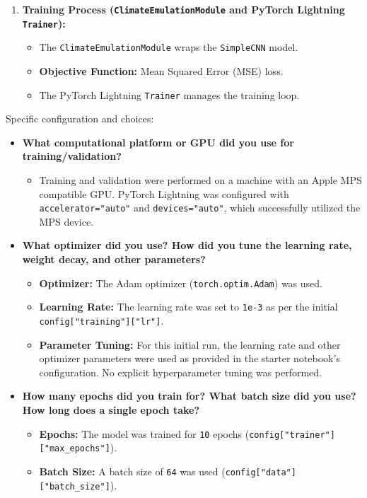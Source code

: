\documentclass{article}
\begin{document}
\begin{enumerate}
    \item \textbf{Training Process (\texttt{ClimateEmulationModule} and PyTorch Lightning \texttt{Trainer}):}
    \begin{itemize}
        \item The \texttt{ClimateEmulationModule} wraps the \texttt{SimpleCNN} model.
        \item \textbf{Objective Function:} Mean Squared Error (MSE) loss.
        \item The PyTorch Lightning \texttt{Trainer} manages the training loop.
    \end{itemize}
\end{enumerate}

Specific configuration and choices:
\begin{itemize}
    \item \textbf{What computational platform or GPU did you use for training/validation?}
    \begin{itemize}
        \item Training and validation were performed on a machine with an Apple MPS compatible GPU. PyTorch Lightning was configured with \texttt{accelerator="auto"} and \texttt{devices="auto"}, which successfully utilized the MPS device.
    \end{itemize}
    \item \textbf{What optimizer did you use? How did you tune the learning rate, weight decay, and other parameters?}
    \begin{itemize}
        \item \textbf{Optimizer:} The Adam optimizer (\texttt{torch.optim.Adam}) was used.
        \item \textbf{Learning Rate:} The learning rate was set to \texttt{1e-3} as per the initial \texttt{config["training"]["lr"]}.
        \item \textbf{Parameter Tuning:} For this initial run, the learning rate and other optimizer parameters were used as provided in the starter notebook's configuration. No explicit hyperparameter tuning was performed.
    \end{itemize}
    \item \textbf{How many epochs did you train for? What batch size did you use? How long does a single epoch take?}
    \begin{itemize}
        \item \textbf{Epochs:} The model was trained for \texttt{10} epochs (\texttt{config["trainer"]["max\_epochs"]}).
        \item \textbf{Batch Size:} A batch size of \texttt{64} was used (\texttt{config["data"]["batch\_size"]}).

\end{itemize}
\end{itemize}
\end{document}
